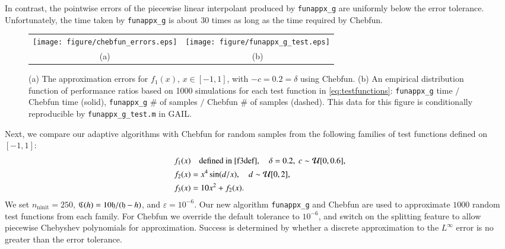 \documentclass[review]{elsarticle}
\newcommand{\abstol}{\varepsilon}
\theoremstyle{definition}
\DeclareMathOperator{\ninit}{ninit}
\newtheorem{exmp}{Example}
\newcommand{\funappxg}{\texttt{funappx\_g}\xspace}
\begin{document}
In contrast, the pointwise errors of the piecewise linear interpolant produced
by \funappxg{} are uniformly below the error tolerance. Unfortunately, the time
taken by \funappxg{} is about $30$ times as long as the time
required by Chebfun. 

\begin{figure}[tb]
\centering
\begin{tabular}{cc}
\texttt{[image: figure/chebfun\_errors.eps]} \hspace{-2.5ex} &
\texttt{[image: figure/funappx\_g\_test.eps]}
\\ (a) & (b)
\end{tabular}
\caption{(a) The approximation errors for $f_1(x)$, $x \in [-1,1]$, with $-c = 0.2=\delta$ 
using  Chebfun. 
(b) An empirical distribution function of performance ratios based on 1000
simulations for each test function in \eqref{eq:testfunctions}:
\funappxg{} time $/$ Chebfun time (solid), \funappxg{} \# of samples $/$
Chebfun \# of samples (dashed). 
This data for this figure is conditionally reproducible 
by 
\texttt{funappx\_g\_test.m} in GAIL.
\label{f3chebfig}} %
\end{figure}




Next, we compare our adaptive algorithms with Chebfun  for random samples from the 
following families of test functions defined on $ [-1, 1]$:
\begin{subequations} \label{eq:testfunctions}
\begin{align}
f_1(x) & \quad \text{defined in \eqref{f3def}}, \quad \delta = 0.2, \ c \sim \mathcal{U}[0,0.6], \\
f_2(x) &= x^4 \sin(d/x), \quad d \sim \mathcal{U}[0,2], \\
f_3(x) &= 10  x^2 + f_2(x).
\end{align}
\end{subequations}
We set $n_{\ninit}= 250$, $\mathfrak{C} (h) =
10 \mathfrak{h}/(\mathfrak{h}-h)$, and $\abstol = 10^{-6}$. Our new algorithm \texttt{funappx\_g}
and Chebfun are
used to approximate $1000$ random test functions from each family. For Chebfun we
override the default tolerance to $10^{-6}$, and switch on the splitting
feature to allow piecewise Chebyshev polynomials for approximation.  Success  is 
determined by whether a discrete approximation to the $L^{\infty}$ error is 
no greater than the error tolerance.
\end{document}
